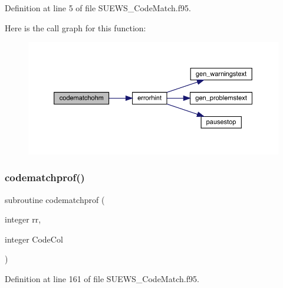 Definition at line 5 of file S\+U\+E\+W\+S\+\_\+\+Code\+Match.\+f95.

Here is the call graph for this function\+:\nopagebreak
\begin{figure}[H]
\begin{center}
\leavevmode
\includegraphics[width=350pt]{_s_u_e_w_s___code_match_8f95_a18fb6403f079ac99af5a646b8f01e05e_cgraph}
\end{center}
\end{figure}
\mbox{\label{_s_u_e_w_s___code_match_8f95_a835fa5788ff93415350c246bf2f11f2b}} 
\subsubsection{\texorpdfstring{codematchprof()}{codematchprof()}}
{\footnotesize\ttfamily subroutine codematchprof (\begin{DoxyParamCaption}\item[{integer}]{rr,  }\item[{integer}]{Code\+Col }\end{DoxyParamCaption})}



Definition at line 161 of file S\+U\+E\+W\+S\+\_\+\+Code\+Match.\+f95.


